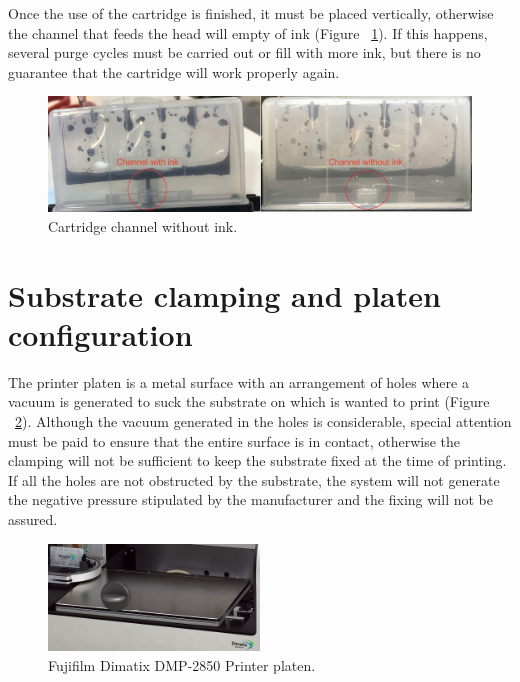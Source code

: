 Once the use of the cartridge is finished, it must be placed vertically, otherwise the channel that feeds the head will empty of ink (Figure ~\ref{fig:Figura_canal_cartucho_vacio}). If this happens, several purge cycles must be carried out or fill with more ink, but there is no guarantee that the cartridge will work properly again.

\begin{figure}[H]
  \centering
    \includegraphics[width=1\textwidth]{Figures/Figura_canal_cartucho_vacio}
  \caption{Cartridge channel without ink.}
  \label{fig:Figura_canal_cartucho_vacio}
\end{figure}

\section{Substrate clamping and platen configuration}
The printer platen is a metal surface with an arrangement of holes where a vacuum is generated to suck the substrate on which is wanted to print (Figure ~\ref{fig:Figura_platina}). Although the vacuum generated in the holes is considerable, special attention must be paid to ensure that the entire surface is in contact, otherwise the clamping will not be sufficient to keep the substrate fixed at the time of printing. If all the holes are not obstructed by the substrate, the system will not generate the negative pressure stipulated by the manufacturer and the fixing will not be assured.

\begin{figure}[H]
  \centering
    \includegraphics[width=0.5\textwidth]{Figures/Figura_platina}
  \caption{Fujifilm Dimatix DMP-2850 Printer platen.}
  \label{fig:Figura_platina}
\end{figure}

